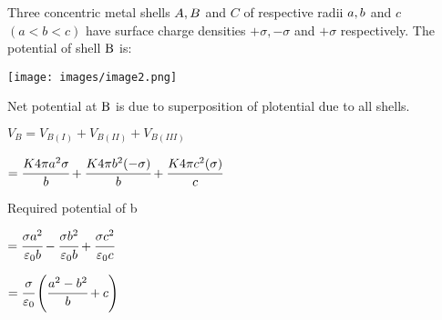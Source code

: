 \documentclass{article}
\begin{document}
Three concentric metal shells \(A,{\rm{ }}B\) and \(C\) of respective radii \(a,{\rm{ }}b\) and \(c\) \((a < b < c)\) have surface charge densities \( + \sigma , - \sigma \) and \( + \sigma \) respectively. The potential of shell \({\rm{B}}\) is:

\begin{center}
	\texttt{[image: images/image2.png]}
\end{center}

Net potential at \({\rm{B}}\) is due to superposition of plotential due to all shells.

\({V_B} = {V_{B(I)}} + {V_{B(II)}} + {V_{B(III)}}\)

\( = \cfrac{{K4\pi {a^2}\sigma }}{b} + \cfrac{{K4\pi {b^2}( - \sigma )}}{b} + \cfrac{{K4\pi {c^2}(\sigma )}}{c}\)

Required potential of b

\( = \cfrac{{\sigma {a^2}}}{{{\varepsilon _0}b}} - \cfrac{{\sigma {b^2}}}{{{\varepsilon _0}b}} + \cfrac{{\sigma {c^2}}}{{{\varepsilon _0}c}}\)

\( = \cfrac{\sigma }{{{\varepsilon _0}}}\left( {\cfrac{{{a^2} - {b^2}}}{b} + c} \right)\)
\end{document}
